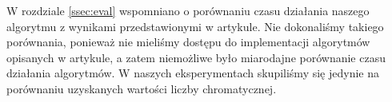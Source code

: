 \documentclass[12pt,a4paper]{article}
\begin{document}
W rozdziale \ref{ssec:eval} wspomniano o porównaniu czasu działania naszego algorytmu z wynikami przedstawionymi w artykule. Nie dokonaliśmy takiego porównania, ponieważ nie mieliśmy dostępu do implementacji algorytmów opisanych w artykule, a zatem niemożliwe było miarodajne porównanie czasu działania algorytmów. W naszych eksperymentach skupiliśmy się jedynie na porównaniu uzyskanych wartości liczby chromatycznej.





\nocite{*}

\end{document}

